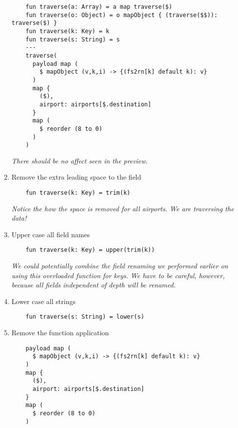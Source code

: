 \begin{enumerate}
  \begin{verbatim}
    fun traverse(a: Array) = a map traverse($)
    fun traverse(o: Object) = o mapObject { (traverse($$)): traverse($) }
    fun traverse(k: Key) = k
    fun traverse(s: String) = s
    ---
    traverse(
      payload map (
        $ mapObject (v,k,i) -> {(fs2rn[k] default k): v}
      )
      map {
        ($),
        airport: airports[$.destination]
      }
      map (
        $ reorder (8 to 0)
      )
    )
  \end{verbatim}
  \emph{
    There should be no affect seen in the preview.
  }
\item Remove the extra leading space to the  field
  \begin{verbatim}
    fun traverse(k: Key) = trim(k)
  \end{verbatim}
  \emph{
    Notice the how the space is removed for all airports.  We are traversing the data!
  }
\item Upper case all field names
  \begin{verbatim}
    fun traverse(k: Key) = upper(trim(k))
  \end{verbatim}
  \emph{
    We could potentially combine the field renaming we performed earlier on using this overloaded  function for keys.  We have to be careful, however, because all fields independent of depth will be renamed.
  }
\item Lower case all strings
  \begin{verbatim}
    fun traverse(s: String) = lower(s)
  \end{verbatim}
\item Remove the  function application
  \begin{verbatim}
    payload map (
      $ mapObject (v,k,i) -> {(fs2rn[k] default k): v}
    )
    map {
      ($),
      airport: airports[$.destination]
    }
    map (
      $ reorder (8 to 0)
    )
  \end{verbatim}
\end{enumerate}

